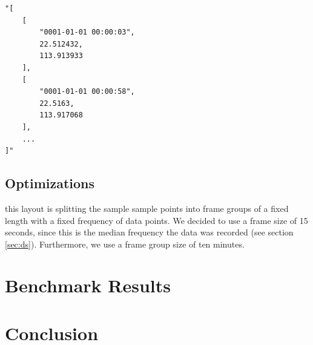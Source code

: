 \documentclass[10pt]{sig-alternate}
\begin{document}
\lstset{language=json}
\begin{minipage}{0.45\textwidth}
\begin{lstlisting}[frame=single, firstnumber=1, caption=Key-Value format example entry,label=lst:json]
"[
    [
        "0001-01-01 00:00:03",
        22.512432,
        113.913933
    ],
    [
        "0001-01-01 00:00:58",
        22.5163,
        113.917068
    ],
    ...
]"
\end{lstlisting}
\end{minipage}


\subsection{Optimizations}


this layout is splitting the sample sample points into frame groups of a fixed length with a fixed frequency of data points. We decided to use a frame size of 15 seconds, since this is the median frequency the data was recorded (see section \ref{sec:ds}). Furthermore, we use a frame group size of ten minutes.


\section{Benchmark Results}

\section{Conclusion}

% 


\end{document}
